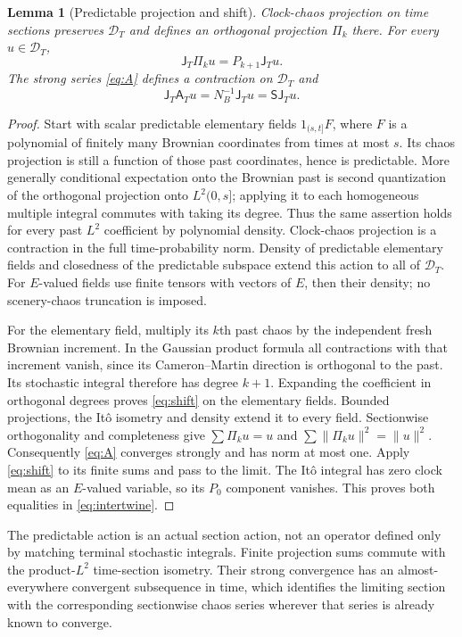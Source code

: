 \documentclass[11pt]{article}
\newtheorem{lemma}[theorem]{Lemma}
\newcommand{\DD}{\mathcal D}
\newcommand{\Smo}{\mathsf S}
\newcommand{\Reg}{\mathsf A}
\newcommand{\J}{\mathsf J}
\begin{document}
\begin{lemma}[Predictable projection and shift]\label{lem:shift}
Clock-chaos projection on time sections preserves $\DD_T$ and defines
an orthogonal projection $\Pi_k$ there. For every $u\in\DD_T$,
\begin{equation}\label{eq:shift}
 \J_T\Pi_ku=P_{k+1}\J_Tu.
\end{equation}
The strong series \eqref{eq:A} defines a contraction on $\DD_T$ and
\begin{equation}\label{eq:intertwine}
 \J_T\Reg_Tu=N_B^{-1}\J_Tu=\Smo\J_Tu.
\end{equation}
\end{lemma}
\begin{proof}
Start with scalar predictable elementary fields
$1_{(s,t]}F$, where $F$ is a polynomial of finitely many Brownian
coordinates from times at most $s$. Its chaos projection is still
a function of those past coordinates, hence is predictable.
More generally conditional expectation onto the Brownian past
is second quantization of the orthogonal projection onto
$L^2(0,s]$; applying it to each homogeneous multiple integral
commutes with taking its degree. Thus the same assertion holds
for every past $L^2$ coefficient by polynomial density.
Clock-chaos projection is a contraction in the full time-probability
norm. Density of predictable elementary fields and closedness of
the predictable subspace extend this action to all of $\DD_T$.
For $E$-valued fields use finite tensors with vectors of $E$,
then their density; no scenery-chaos truncation is imposed.

For the elementary field, multiply its $k$th past chaos by the
independent fresh Brownian increment. In the Gaussian product
formula all contractions with that increment vanish, since its
Cameron--Martin direction is orthogonal to the past. Its stochastic
integral therefore has degree $k+1$. Expanding the coefficient
in orthogonal degrees proves \eqref{eq:shift} on the elementary
fields. Bounded projections, the It\^o isometry and density extend
it to every field. Sectionwise orthogonality and completeness give
$\sum\Pi_ku=u$ and $\sum\|\Pi_ku\|^2=\|u\|^2$. Consequently
\eqref{eq:A} converges strongly and has norm at most one.
Apply \eqref{eq:shift} to its finite sums and pass to the limit.
The It\^o integral has zero clock mean as an $E$-valued variable,
so its $P_0$ component vanishes. This proves both equalities
in \eqref{eq:intertwine}.
\end{proof}
The predictable action is an actual section action, not an operator
defined only by matching terminal stochastic integrals. Finite
projection sums commute with the product-$L^2$ time-section
isometry. Their strong convergence has an almost-everywhere
convergent subsequence in time, which identifies the limiting
section with the corresponding sectionwise chaos series wherever
that series is already known to converge.
\end{document}
